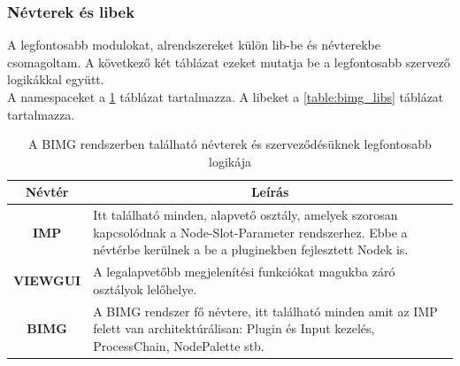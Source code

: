 \documentclass[a4paper,12pt,oneside]{report}
\begin{document}
\subsubsection{Névterek és libek}
A legfontosabb modulokat, alrendszereket külön lib-be és névterekbe csomagoltam. A következő két táblázat ezeket mutatja be a legfontosabb szervező logikákkal együtt. \\ A namespaceket a \ref{table:bimg_namespace} táblázat tartalmazza. A libeket a \ref{table:bimg_libs} táblázat tartalmazza. 
\begin{table}[h]
\begin{tabular}{p{1cm}|p{12cm}}

\toprule
\multicolumn{1}{c|}{\textbf{Névtér}} & \multicolumn{1}{|c}{\textbf{Leírás}} \\ \midrule
\multicolumn{1}{c|}{\textbf{IMP}}  & Itt található minden, alapvető osztály, amelyek szorosan kapcsolódnak a Node-Slot-Parameter rendszerhez. Ebbe a névtérbe kerülnek a be a pluginekben fejlesztett Nodek is.\\
\hline
\multicolumn{1}{c|}{\textbf{VIEWGUI}}  &  A legalapvetőbb megjelenítési funkciókat magukba záró osztályok lelőhelye.\\
\hline
\multicolumn{1}{c|}{\textbf{BIMG}}  & A BIMG rendszer fő névtere, itt található minden amit az IMP felett van architektúrálisan: Plugin és Input kezelés, ProcessChain, NodePalette stb. \\
\hline

\end{tabular}
\caption{A BIMG rendszerben található névterek és szerveződésüknek legfontosabb logikája }
\label{table:bimg_namespace}
\end{table}
\end{document}
